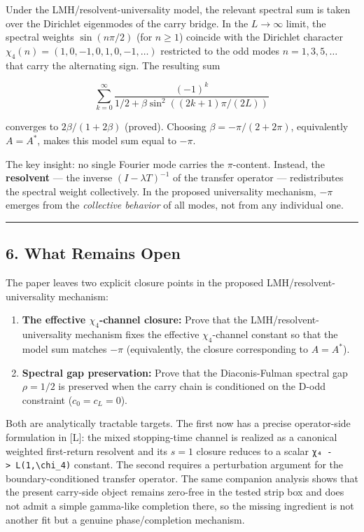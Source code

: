 \documentclass[
  11pt,
]{article}
\begin{document}
Under the LMH/resolvent-universality model, the relevant spectral sum is taken
over the Dirichlet eigenmodes of the carry bridge. In the \(L \to \infty\)
limit, the spectral weights \(\sin(n\pi/2)\) (for \(n \geq 1\)) coincide with
the Dirichlet character \(\chi_4(n) = (1, 0, -1, 0, 1, 0, -1, \ldots)\)
restricted to the odd modes \(n = 1, 3, 5, \ldots\) that carry the alternating
sign. The resulting sum

\[\sum_{k=0}^{\infty} \frac{(-1)^k}{1/2 + \beta \sin^2((2k+1)\pi/(2L))}\]

converges to \(2\beta/(1 + 2\beta)\) (proved). Choosing
\(\beta = -\pi/(2+2\pi)\), equivalently \(A = A^*\), makes this model sum equal
to \(-\pi\).

The key insight: no single Fourier mode carries the \(\pi\)-content. Instead,
the \textbf{resolvent} --- the inverse \((I - \lambda T)^{-1}\) of the transfer
operator --- redistributes the spectral weight collectively. In the proposed
universality mechanism, \(-\pi\) emerges from the \emph{collective behavior} of
all modes, not from any individual one.

\begin{center}\rule{0.5\linewidth}{0.5pt}\end{center}

\newpage

\subsection{6. What Remains Open}\label{what-remains-open}

The paper leaves two explicit closure points in the proposed
LMH/resolvent-universality mechanism:

\begin{enumerate}
\def\labelenumi{\arabic{enumi}.}
\item
  \textbf{The effective \(\chi_4\)-channel closure:} Prove that the
  LMH/resolvent-universality mechanism fixes the effective \(\chi_4\)-channel
  constant so that the model sum matches \(-\pi\) (equivalently, the closure
  corresponding to \(A = A^*\)).
\item
  \textbf{Spectral gap preservation:} Prove that the Diaconis-Fulman spectral
  gap \(\rho = 1/2\) is preserved when the carry chain is conditioned on the
  D-odd constraint (\(c_0 = c_L = 0\)).
\end{enumerate}

Both are analytically tractable targets. The first now has a precise
operator-side formulation in {[}L{]}: the mixed stopping-time channel is
realized as a canonical weighted first-return resolvent and its \(s=1\) closure
reduces to a scalar \texttt{χ₄\ -\textgreater{}\ L(1,\textbackslash{}chi\_4)}
constant. The second requires a perturbation argument for the
boundary-conditioned transfer operator. The same companion analysis shows that
the present carry-side object remains zero-free in the tested strip box and does
not admit a simple gamma-like completion there, so the missing ingredient is not
another fit but a genuine phase/completion mechanism.
\end{document}
